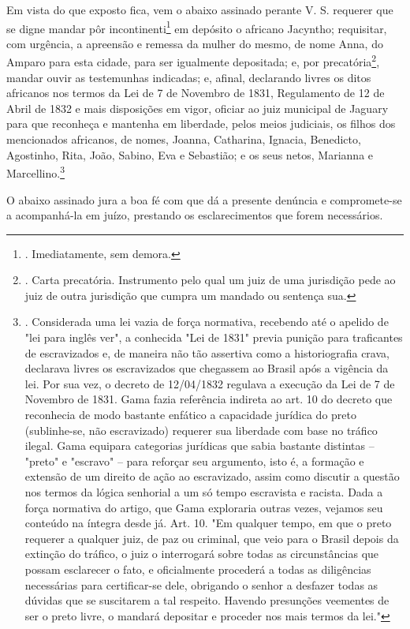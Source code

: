 Em vista do que exposto fica, vem o abaixo assinado perante V. S.
requerer que se digne mandar pôr incontinenti\footnote{. Imediatamente,
  sem demora.} em depósito o africano Jacyntho; requisitar, com
urgência, a apreensão e remessa da mulher do mesmo, de nome Anna, do
Amparo para esta cidade, para ser igualmente depositada; e, por
precatória\footnote{. Carta precatória. Instrumento pelo qual um juiz de
  uma jurisdição pede ao juiz de outra jurisdição que cumpra um mandado
  ou sentença sua.}, mandar ouvir as testemunhas indicadas; e, afinal,
declarando livres os ditos africanos nos termos da Lei de 7 de Novembro
de 1831, Regulamento de 12 de Abril de 1832 e mais disposições em vigor,
oficiar ao juiz municipal de Jaguary para que reconheça e mantenha em
liberdade, pelos meios judiciais, os filhos dos mencionados africanos,
de nomes, Joanna, Catharina, Ignacia, Benedicto, Agostinho, Rita, João,
Sabino, Eva e Sebastião; e os seus netos, Marianna e
Marcellino.\footnote{. Considerada uma lei vazia de força normativa,
  recebendo até o apelido de "lei para inglês ver", a conhecida "Lei de
  1831" previa punição para traficantes de escravizados e, de maneira
  não tão assertiva como a historiografia crava, declarava livres os
  escravizados que chegassem ao Brasil após a vigência da lei. Por sua
  vez, o decreto de 12/04/1832 regulava a execução da Lei de 7 de
  Novembro de 1831. Gama fazia referência indireta ao art. 10 do decreto
  que reconhecia de modo bastante enfático a capacidade jurídica do
  preto (sublinhe-se, não escravizado) requerer sua liberdade com base
  no tráfico ilegal. Gama equipara categorias jurídicas que sabia
  bastante distintas -- "preto" e "escravo" -- para reforçar seu
  argumento, isto é, a formação e extensão de um direito de ação ao
  escravizado, assim como discutir a questão nos termos da lógica
  senhorial a um só tempo escravista e racista. Dada a força normativa
  do artigo, que Gama exploraria outras vezes, vejamos seu conteúdo na
  íntegra desde já. Art. 10. "Em qualquer tempo, em que o preto requerer
  a qualquer juiz, de paz ou criminal, que veio para o Brasil depois da
  extinção do tráfico, o juiz o interrogará sobre todas as
  circunstâncias que possam esclarecer o fato, e oficialmente procederá
  a todas as diligências necessárias para certificar-se dele, obrigando
  o senhor a desfazer todas as dúvidas que se suscitarem a tal respeito.
  Havendo presunções veementes de ser o preto livre, o mandará depositar
  e proceder nos mais termos da lei."}

O abaixo assinado jura a boa fé com que dá a presente denúncia e
compromete-se a acompanhá-la em juízo, prestando os esclarecimentos que
forem necessários.

